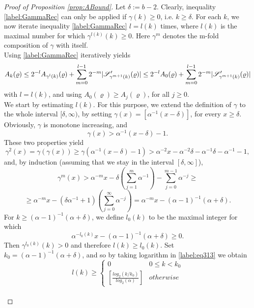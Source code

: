 \documentclass[11pt,reqno]{article}
\DeclarePairedDelimiter\abs{\lvert}{\rvert}%
\theoremstyle{definition}
\newcommand{\twopartdef}[4]
{
	\left\{
		\begin{array}{ll}
			#1 & #2 \\
			#3 & #4
		\end{array}
	\right.
}
\numberwithin{equation}{section}
\begin{document}
\begin{proof}[Proof of Proposition \eqref{prop:ABound}]
Let $\delta:=b-2$. Clearly, inequality \eqref{label:GammaRec} can only be applied if $\gamma(k) \geq 0$, i.e. $k \geq \delta$. For each $k$, we now iterate inequality \eqref{label:GammaRec} $l=l(k)$ times, where $l(k)$ is the maximal number for which $\gamma^{l(k)}(k) \geq 0$. Here $\gamma^m$ denotes the m-fold composition of $\gamma$ with itself.\\
Using \eqref{label:GammaRec} iteratively yields
\begin{equation} \label{label:lab310}
A_k(\varrho) \leq 
2^{-l}A_{\gamma^l(k)}(\varrho) + \sum_{m=0}^{l-1} 2^{-m} \abs{\mathscr{S}^\prime_{\gamma^{m+1}(k)}(\varrho)} \leq 
2^{-l}A_0(\varrho) + \sum_{m=0}^{l-1} 2^{-m} \abs{\mathscr{S}^\prime_{\gamma^{m+1}(k)}(\varrho)}
\end{equation}
with $l=l(k)$, and using $A_0(\varrho) \geq A_j(\varrho)$, for all $j \geq 0$.\\

We start by estimating $l(k)$. For this purpose, we extend the definition of $\gamma$ to the whole interval $[\delta, \infty)$, by setting $\gamma(x)=[\alpha^{-1}(x-\delta)]$, for every $x \geq \delta$. Obviously, $\gamma$ is monotone increasing, and
$$\gamma(x) > \alpha^{-1}(x-\delta)-1.$$
These two properties yield
$$\gamma^2(x) = \gamma(\gamma(x)) \geq \gamma(\alpha^{-1}(x-\delta)-1) > 
\alpha^{-2}x - \alpha^{-2}\delta - \alpha^{-1}\delta - \alpha^{-1} - 1,$$
and, by induction (assuming that we stay in the interval $[\delta, \infty]$),
\newcommand*{\alphadelta}{(\alpha-1)^{-1}(\alpha+\delta)}
$$
\gamma^m(x) > \alpha^{-m}x - \delta (\sum_{j=1}^m \alpha^{-1}) - \sum_{j=0}^{m-1}\alpha^{-j} \geq
$$
$$
\geq \alpha^{-m}x - (\delta\alpha^{-1}+1)(\sum_{j=0}^\infty\alpha^{-j}) = 
\alpha^{-m}x - \alphadelta.
$$
For $k \geq \alphadelta$, we define $l_0(k)$ to be the maximal integer for which
\begin{equation} \label{label:eq313}
\alpha^{-l_0(k)}x - \alphadelta \geq 0.
\end{equation}
Then $\gamma^{l_0(k)}(k) > 0$ and therefore $l(k) \geq l_0(k)$. Set $k_0=(\alpha-1)^{-1}(\alpha+\delta)$, and so by taking logarithm in \eqref{label:eq313} we obtain
\begin{equation} \label{label:eq314}
l(k) \geq \twopartdef { 0 } {0 \leq k < k_0} {{[\frac{log_2(k/k_0)}{log_2(\alpha)}]}} {otherwise}
\end{equation}\\


\end{proof}
\end{document}
